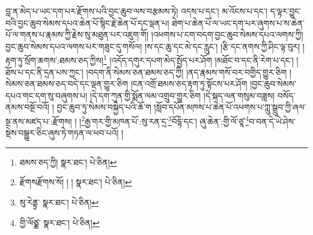 བླ་ན་མེད་པ་ཡང་དག་པར་རྫོགས་པའི་བྱང་ཆུབ་ལས་བརྩམས་ཏེ། འདས་པ་དང་། མ་འོངས་པ་དང་། ད་ལྟར་བྱུང་བའི་བྱང་ཆུབ་སེམས་དཔའ་ཆེན་པོ་སྙིང་རྗེ་ཆེན་པོ་དང་ལྡན་པ། ཐེག་པ་ཆེན་པོ་ལ་ཡང་དག་པར་ཞུགས་པ་ས་ཆེན་པོ་ལ་གནས་པ་རྣམས་ཀྱི་རྗེས་སུ་མཐུན་པར་འཇུག་གོ། །འཕགས་པ་ངག་བདག་བྱང་ཆུབ་སེམས་དཔའ་ལགས་ཀྱི། བྱང་ཆུབ་སེམས་དཔའ་ལགས་པར་གཟུང་དུ་གསོལ། །ས་དང་ཆུ་དང་མེ་དང་རླུང་། །རྩི་དང་ནགས་ཀྱི་ཤིང་ལྟ་བུར། །རྟག་ཏུ་སྲོག་ཆགས་:ཐམས་ཅད་ཀྱིས།\footnote{ཐམས་ཅད་ཀྱི།  སྣར་ཐང་།  པེ་ཅིན། } །འདོད་དགུར་དཔག་མེད་སྤྱོད་པར་ཤོག །མཐོང་བ་དང་ནི་རེག་པ་དང་། །ཐོས་པ་དང་ནི་དྲན་པས་ཀྱང་། །བདག་ནི་སེམས་ཅན་ཐམས་ཅད་ཀྱི། །ནད་རྣམས་གསོ་བར་བགྱིད་གྱུར་ཅིག །སེམས་ཅན་ཐམས་ཅད་བདེ་དང་ལྡན་གྱུར་ཅིག །ངན་འགྲོ་ཐམས་ཅད་རྟག་ཏུ་སྟོངས་པར་ཤོག །བྱང་ཆུབ་སེམས་དཔའ་གང་དག་སུ་བཞུགས་པ། །དེ་དག་ཀུན་གྱི་སྨོན་ལམ་འགྲུབ་གྱུར་ཅིག །དེ་སྐད་ལན་གསུམ་བཟླས། བསོད་ནམས་བསྔོ་བའོ། །
བྱང་ཆུབ་ཏུ་སེམས་བསྐྱེད་པའི་ཆོ་ག །སློབ་དཔོན་མཁས་པ་ཆེན་པོ་འཕགས་པ་ཀླུ་སྒྲུབ་ཀྱི་ཞལ་སྔ་ནས་མཛད་པ་:རྫོགས། ། །\footnote{རྫོགསརྫོགས་སོ། ། །  སྣར་ཐང་།  པེ་ཅིན། }རྒྱ་གར་གྱི་མཁན་པོ་:སུ་རན་དྲ་\footnote{སུ་རེནྟྲ་  སྣར་ཐང་།  པེ་ཅིན། }བོདྷི་དང་། ཞུ་ཆེན་:གྱི་ལོ་ཙཱ་\footnote{གྱི་ལོཙྪ་  སྣར་ཐང་།  པེ་ཅིན། }བ་བན་དེ་ཡེ་ཤེས་སྡེས་བསྒྱུར་ཅིང་ཞུས་ཏེ་གཏན་ལ་ཕབ་པའོ། ། 